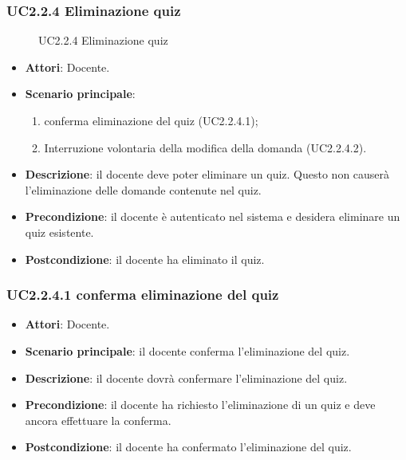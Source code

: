 \subsubsection{UC2.2.4 Eliminazione quiz}
\begin{figure}[H]
\centering
\noindent{}
\caption{UC2.2.4 Eliminazione quiz}
\end{figure}
\begin{itemize}
\item \textbf{Attori}: Docente.
\item \textbf{Scenario principale}:
\begin{enumerate}
\item conferma eliminazione del quiz (UC2.2.4.1);
\item Interruzione volontaria della modifica della domanda (UC2.2.4.2).
\end{enumerate}
\item \textbf{Descrizione}: il docente deve poter eliminare un quiz. Questo non causerà l’eliminazione delle domande contenute nel quiz.
\item \textbf{Precondizione}: il docente è autenticato nel sistema e desidera eliminare un quiz esistente.
\item \textbf{Postcondizione}: il docente ha eliminato il quiz.
\end{itemize}
\subsubsection{UC2.2.4.1 conferma eliminazione del quiz}
\begin{itemize}
\item \textbf{Attori}: Docente.
\item \textbf{Scenario principale}: il docente conferma l'eliminazione del quiz.
\item \textbf{Descrizione}: il docente dovrà confermare l'eliminazione del quiz.
\item \textbf{Precondizione}: il docente ha richiesto l'eliminazione di un quiz e deve ancora effettuare la conferma.
\item \textbf{Postcondizione}: il docente ha confermato l'eliminazione del quiz.
\end{itemize}
